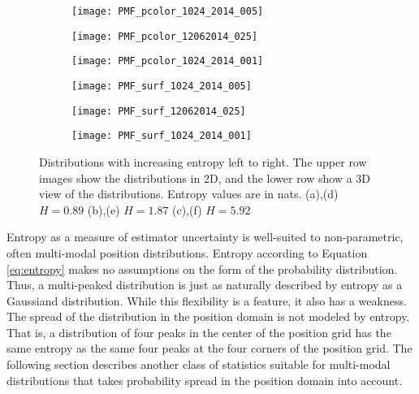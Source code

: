 \begin{figure}[!h]
	\centering
	\begin{subfigure}[b]{0.32\textwidth}
                \texttt{[image: PMF\_pcolor\_1024\_2014\_005]}
                \caption{}
  	\end{subfigure}
  	\centering
	\begin{subfigure}[b]{0.32\textwidth}
                \texttt{[image: PMF\_pcolor\_12062014\_025]}
                \caption{}
  	\end{subfigure}
	\centering
	\begin{subfigure}[b]{0.32\textwidth}
                \texttt{[image: PMF\_pcolor\_1024\_2014\_001]}
                \caption{}
  	\end{subfigure}
 	
 	\begin{subfigure}[b]{0.32\textwidth}
                \texttt{[image: PMF\_surf\_1024\_2014\_005]}
                \caption{}
  	\end{subfigure}
  	\centering
	\begin{subfigure}[b]{0.32\textwidth}
                \texttt{[image: PMF\_surf\_12062014\_025]}
                \caption{}
  	\end{subfigure}
	\centering
	\begin{subfigure}[b]{0.32\textwidth}
                \texttt{[image: PMF\_surf\_1024\_2014\_001]}
                \caption{}
  	\end{subfigure}
  	
	\caption{Distributions with increasing entropy left to right. The upper row images show the distributions in 2D, and the lower row show a 3D view of the distributions. Entropy values are in nats. (a),(d) $H = 0.89$ (b),(e) $H=1.87$  (c),(f) $H=5.92$}	
	\label{fig:entropy}
\end{figure}

Entropy as a measure of estimator uncertainty is well-suited to non-parametric, often multi-modal position distributions.
Entropy according to Equation \ref{eq:entropy} makes no assumptions on the form of the probability distribution.
Thus, a multi-peaked distribution is just as naturally described by entropy as a Gaussiand distribution.
While this flexibility is a feature, it also has a weakness.
The spread of the distribution in the position domain is not modeled by entropy.
That is, a distribution of four peaks in the center of the position grid has the same entropy as the same four peaks at the four corners of the position grid.
The following section describes another class of statistics suitable for multi-modal distributions that takes probability spread in the position domain into account.


